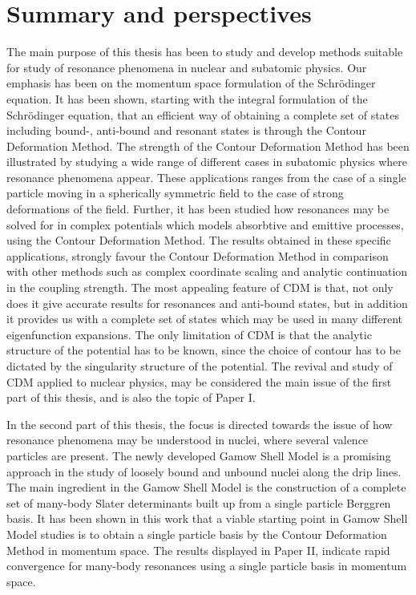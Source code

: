 \chapter{Summary and perspectives}
\label{chap:conclusions}
The main purpose of this thesis has been to study and develop methods 
suitable for study of resonance phenomena in nuclear and subatomic physics. 
Our emphasis has been on the momentum space formulation of the Schr\"odinger
equation. It has been shown, starting with 
the integral formulation of the Schr\"odinger equation, that an efficient way 
of obtaining a complete set of states including bound-, anti-bound and
resonant states is through the Contour Deformation Method. The 
strength of the Contour Deformation Method has been 
illustrated by studying a wide range of different cases in 
subatomic physics where resonance phenomena appear. These
applications ranges from the case of a single particle moving 
in a spherically symmetric field to the case of strong deformations
of the field. Further, it has been studied how resonances may be solved for
in complex potentials which models absorbtive and emittive 
processes, using the Contour Deformation Method. 
The results obtained in these specific applications, strongly favour the 
Contour Deformation Method in comparison with other methods
such as complex coordinate scaling and analytic continuation in the coupling
strength. The most appealing feature of CDM is that, not only does  
it give accurate results for resonances and anti-bound states, but 
in addition it provides us with a complete set of states 
which may be used in many different eigenfunction expansions. 
The only limitation of CDM is that the analytic structure of the
potential has to be known, since the choice of contour has to 
be dictated by the singularity structure of the potential. The 
revival and study of CDM applied to nuclear physics, may 
be considered the main issue of the first part of this thesis, and 
is also the topic of Paper I. 

In the second part of this thesis, the focus is directed towards
the issue of how resonance phenomena may be understood in nuclei, 
where several valence particles are present. The newly developed
Gamow Shell Model is a promising approach in the study of loosely bound and 
unbound nuclei along the drip lines. The main ingredient in the Gamow Shell Model 
is the construction of a complete set of many-body Slater determinants 
built up from a single particle Berggren basis. It has been shown in this
work that a viable starting point in Gamow Shell Model studies is 
to obtain a single particle basis by the Contour Deformation 
Method in momentum space. The results displayed in Paper II, 
indicate rapid convergence for many-body resonances using 
a single particle basis in momentum space.

